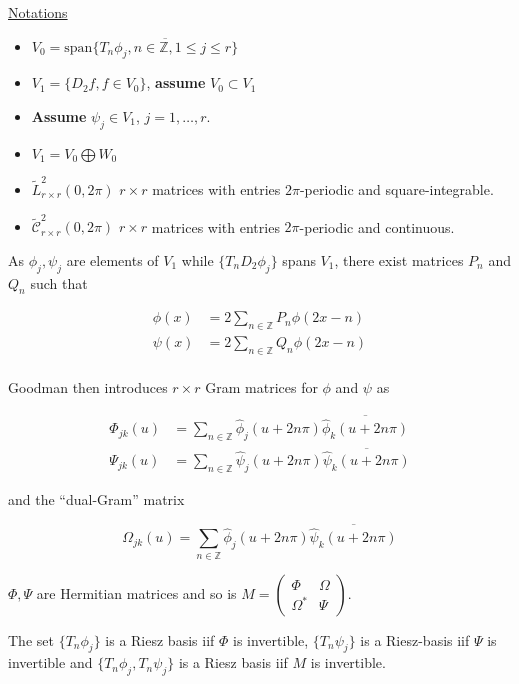 \documentclass[a4paper, 11pt]{article}
\begin{document}
\underline{Notations}
\begin{itemize}
  \item $V_0 = \text{span} \overline{\{ T_n \phi_j, n \in \mathbb{Z}, 1 \leq j \leq r\}}$
  \item $V_1 = \{D_2 f, f\in V_0\}$, \textbf{assume} $V_0 \subset V_1$
  \item \textbf{Assume} $\psi_j \in V_1$, $j=1, \ldots, r$.
  \item $V_1 = V_0 \bigoplus W_0$
  \item $\tilde{L}^2_{r\times r}(0, 2\pi)$ $r\times r$ matrices with entries $2\pi$-periodic and square-integrable.
  \item $\tilde{\mathcal{C}}^2_{r\times r}(0, 2\pi)$ $r\times r$ matrices with entries $2\pi$-periodic and continuous.
\end{itemize}

As $\phi_j, \psi_j$ are elements of $V_1$ while $\{T_n D_2 \phi_j\}$ spans $V_1$, there exist matrices $P_n$ and $Q_n$ 
such that

\begin{align*}
  \phi(x) &= 2 \sum_{n \in \mathbb{Z}} P_n \phi(2x-n) \\
  \psi(x) &= 2 \sum_{n \in \mathbb{Z}} Q_n \phi(2x-n) \\
\end{align*}

Goodman then introduces $r\times r$ Gram matrices for $\phi$ and $\psi$ as

\begin{align*}
  \Phi_{jk}(u) &= \sum_{n\in \mathbb{Z}} \hat{\phi}_j(u+2n\pi) \overline{\hat{\phi}_k(u+2n\pi)} \\
  \Psi_{jk}(u) &= \sum_{n\in \mathbb{Z}} \hat{\psi}_j(u+2n\pi) \overline{\hat{\psi}_k(u+2n\pi)}
\end{align*}

and the “dual-Gram” matrix

\begin{equation*}
  \Omega_{jk}(u) = \sum_{n\in \mathbb{Z}} \hat{\phi}_j(u+2n\pi) \overline{\hat{\psi}_k(u+2n\pi)}
\end{equation*}

$\Phi, \Psi$ are Hermitian matrices and so is $M = \begin{pmatrix} \Phi & \Omega \\ \Omega^* & \Psi \end{pmatrix}$.

\begin{prop}{2.1}
  The set $\{T_n\phi_j\}$ is a Riesz basis iif $\Phi$ is invertible, $\{T_n\psi_j\}$ is a Riesz-basis iif $\Psi$ is 
  invertible and $\{T_n\phi_j, T_n\psi_j\}$ is a Riesz basis iif $M$ is invertible.
\end{prop}
\end{document}
